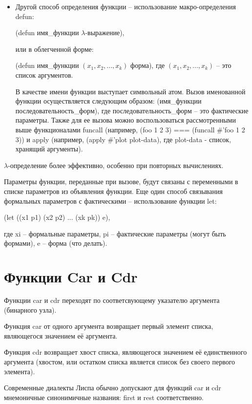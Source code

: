 \documentclass[12pt]{report}
\begin{document}
\begin{itemize}
	\item Другой способ определения функции -- использование макро-определения defun: 
	
	(defun имя\_функции $\lambda$-выражение), 
	
	или  в облегченной форме:
	
	(defun имя\_функции $(x_1, x_2, ..., x_k)$ форма), 
	где $(x_1, x_2, ..., x_k)$ -- это  список аргументов.
	
	В качестве имени функции выступает символьный атом. 
	Вызов именованной функции осуществляется следующим образом: (имя\_функции последовательность\_форм), 
	где последовательность\_форм -- это фактические параметры.
	Также для ее вызова можно воспользоваться рассмотренными выше функционалами funcall (например, (foo 1 2 3) === (funcall \#'foo 1 2 3)) и apply (например, (apply \#'plot plot-data), где plot-data - список, хранящий аргументы).
	
\end{itemize}

$\lambda$-определение более эффективно, особенно при повторных вычислениях. 

Параметры функции, переданные при вызове, будут связаны с переменными в списке параметров из объявления функции. Еще один способ связывания формальных параметров с фактическими -- использование функции let:

(let ((x1 p1) (x2 p2) ... (xk pk))  e),

где xi -- формальные параметры, pi -- фактические параметры (могут быть формами), e -- форма (что делать).

\section*{Функции Car и Cdr}

Функции car и cdr переходят по соответсвующему указателю аргумента (бинарного узла).

Функция car от одного аргумента возвращает первый элемент списка, являющегося значением её аргумента. 

Функция cdr возвращает хвост списка, являющегося значением её единственного аргумента (хвостом, или остатком списка является список  без своего первого элемента).  

Современные диалекты  Лиспа обычно допускают для функций car и cdr мнемоничные синонимичные названия: first и rest соответственно.



 
\end{document}
